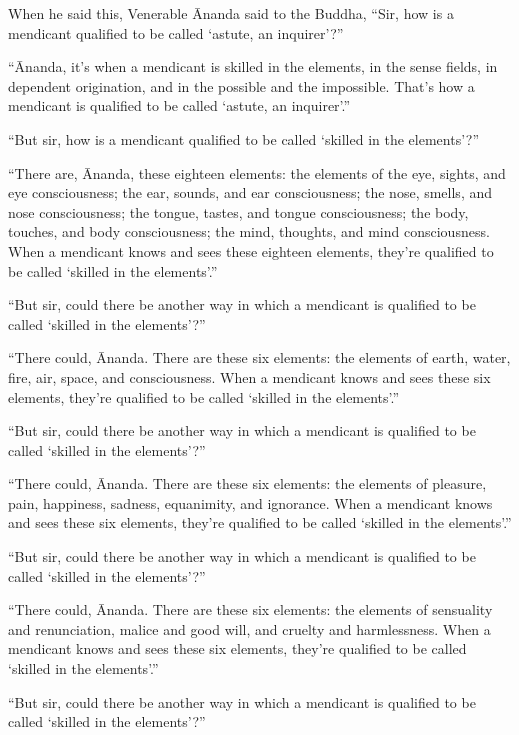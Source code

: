 \documentclass[12pt,openany]{book}%
\begin{document}
When he said this, Venerable Ānanda said to the Buddha, “Sir, how is a mendicant qualified to be called ‘astute, an inquirer’?” 

“Ānanda, it’s when a mendicant is skilled in the elements, in the sense fields, in dependent origination, and in the possible and the impossible. That’s how a mendicant is qualified to be called ‘astute, an inquirer’.” 

“But sir, how is a mendicant qualified to be called ‘skilled in the elements’?” 

“There are, Ānanda, these eighteen elements: the elements of the eye, sights, and eye consciousness; the ear, sounds, and ear consciousness; the nose, smells, and nose consciousness; the tongue, tastes, and tongue consciousness; the body, touches, and body consciousness; the mind, thoughts, and mind consciousness. When a mendicant knows and sees these eighteen elements, they’re qualified to be called ‘skilled in the elements’.” 

“But sir, could there be another way in which a mendicant is qualified to be called ‘skilled in the elements’?” 

“There could, Ānanda. There are these six elements: the elements of earth, water, fire, air, space, and consciousness. When a mendicant knows and sees these six elements, they’re qualified to be called ‘skilled in the elements’.” 

“But sir, could there be another way in which a mendicant is qualified to be called ‘skilled in the elements’?” 

“There could, Ānanda. There are these six elements: the elements of pleasure, pain, happiness, sadness, equanimity, and ignorance. When a mendicant knows and sees these six elements, they’re qualified to be called ‘skilled in the elements’.” 

“But sir, could there be another way in which a mendicant is qualified to be called ‘skilled in the elements’?” 

“There could, Ānanda. There are these six elements: the elements of sensuality and renunciation, malice and good will, and cruelty and harmlessness. When a mendicant knows and sees these six elements, they’re qualified to be called ‘skilled in the elements’.” 

“But sir, could there be another way in which a mendicant is qualified to be called ‘skilled in the elements’?” 
\end{document}
